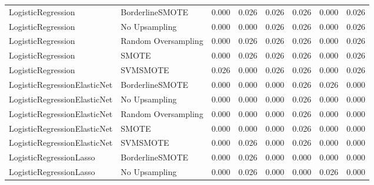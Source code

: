 \begin{tabular}{llllllll}
          LogisticRegression &     BorderlineSMOTE & 0.000 &                     0.026 &                 0.026 &                  0.026 &                                   0.000 &    0.026 \\
          LogisticRegression &       No Upsampling & 0.000 &                     0.000 &                 0.026 &                  0.026 &                                   0.000 &    0.026 \\
          LogisticRegression & Random Oversampling & 0.000 &                     0.026 &                 0.026 &                  0.026 &                                   0.000 &    0.026 \\
          LogisticRegression &               SMOTE & 0.000 &                     0.026 &                 0.026 &                  0.026 &                                   0.000 &    0.026 \\
          LogisticRegression &            SVMSMOTE & 0.026 &                     0.000 &                 0.026 &                  0.026 &                                   0.000 &    0.026 \\
LogisticRegressionElasticNet &     BorderlineSMOTE & 0.000 &                     0.000 &                 0.000 &                  0.026 &                                   0.026 &    0.000 \\
LogisticRegressionElasticNet &       No Upsampling & 0.000 &                     0.000 &                 0.000 &                  0.026 &                                   0.000 &    0.000 \\
LogisticRegressionElasticNet & Random Oversampling & 0.000 &                     0.000 &                 0.000 &                  0.026 &                                   0.000 &    0.000 \\
LogisticRegressionElasticNet &               SMOTE & 0.000 &                     0.000 &                 0.000 &                  0.026 &                                   0.000 &    0.000 \\
LogisticRegressionElasticNet &            SVMSMOTE & 0.000 &                     0.026 &                 0.000 &                  0.026 &                                   0.000 &    0.000 \\
     LogisticRegressionLasso &     BorderlineSMOTE & 0.000 &                     0.026 &                 0.000 &                  0.000 &                                   0.000 &    0.000 \\
     LogisticRegressionLasso &       No Upsampling & 0.000 &                     0.026 &                 0.000 &                  0.000 &                                   0.026 &    0.000 \\

\end{tabular}
